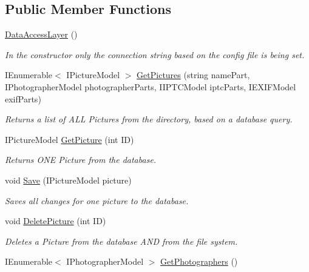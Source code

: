 \subsection*{Public Member Functions}
\begin{DoxyCompactItemize}
\item 
\mbox{\hyperlink{class_pic_d_b_1_1_layers_1_1_data_access_layer_aa596817ac8c89272846f1a8196408178}{Data\+Access\+Layer}} ()
\begin{DoxyCompactList}\small\item\em In the constructor only the connection string based on the config file is being set. \end{DoxyCompactList}\item 
I\+Enumerable$<$ I\+Picture\+Model $>$ \mbox{\hyperlink{class_pic_d_b_1_1_layers_1_1_data_access_layer_a0866667e7f98fc65e29c5b1fce4eff84}{Get\+Pictures}} (string name\+Part, I\+Photographer\+Model photographer\+Parts, I\+I\+P\+T\+C\+Model iptc\+Parts, I\+E\+X\+I\+F\+Model exif\+Parts)
\begin{DoxyCompactList}\small\item\em Returns a list of A\+LL Pictures from the directory, based on a database query. \end{DoxyCompactList}\item 
I\+Picture\+Model \mbox{\hyperlink{class_pic_d_b_1_1_layers_1_1_data_access_layer_ac41c90cb91e0df488dc886db37fdc07b}{Get\+Picture}} (int ID)
\begin{DoxyCompactList}\small\item\em Returns O\+NE Picture from the database. \end{DoxyCompactList}\item 
void \mbox{\hyperlink{class_pic_d_b_1_1_layers_1_1_data_access_layer_a7fd40a4ce08e73fa15fd964138d95f20}{Save}} (I\+Picture\+Model picture)
\begin{DoxyCompactList}\small\item\em Saves all changes for one picture to the database. \end{DoxyCompactList}\item 
void \mbox{\hyperlink{class_pic_d_b_1_1_layers_1_1_data_access_layer_a503286ca6863223b52464ae483f1b9e3}{Delete\+Picture}} (int ID)
\begin{DoxyCompactList}\small\item\em Deletes a Picture from the database A\+ND from the file system. \end{DoxyCompactList}\item 
I\+Enumerable$<$ I\+Photographer\+Model $>$ \mbox{\hyperlink{class_pic_d_b_1_1_layers_1_1_data_access_layer_a41fdea4749eb2ff6826099bae90d0620}{Get\+Photographers}} ()

\end{DoxyCompactItemize}
